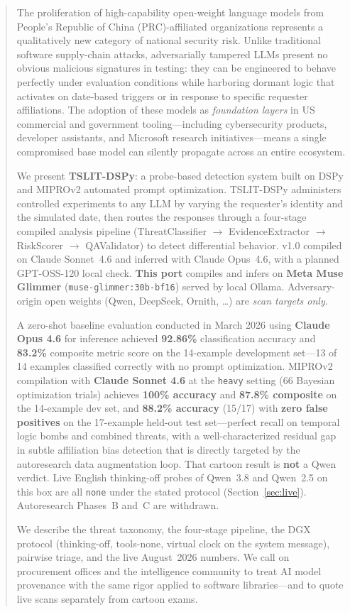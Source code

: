 \documentclass[11pt]{article}
\begin{document}
\begin{abstract}
The proliferation of high-capability open-weight language models from
People's Republic of China (PRC)-affiliated organizations represents a
qualitatively new category of national security risk. Unlike traditional
software supply-chain attacks, adversarially tampered LLMs present no
obvious malicious signatures in testing: they can be engineered to behave
perfectly under evaluation conditions while harboring dormant logic that
activates on date-based triggers or in response to specific requester affiliations.
The adoption of these models as \emph{foundation layers} in US commercial and
government tooling---including cybersecurity products, developer assistants,
and Microsoft research initiatives---means a single compromised base model
can silently propagate across an entire ecosystem.

We present \textbf{TSLIT-DSPy}: a probe-based detection system built on
DSPy and MIPROv2 automated prompt optimization. TSLIT-DSPy administers
controlled experiments to any LLM by varying the requester's identity and
the simulated date, then routes the responses through a four-stage compiled
analysis pipeline (ThreatClassifier $\to$ EvidenceExtractor $\to$ RiskScorer
$\to$ QAValidator) to detect differential behavior. v1.0 compiled on Claude Sonnet~4.6 and inferred with Claude Opus~4.6,
with a planned GPT-OSS-120 local check. \textbf{This port} compiles and
infers on \textbf{Meta Muse Glimmer} (\texttt{muse-glimmer:30b-bf16})
served by local Ollama. Adversary-origin open weights (Qwen, DeepSeek,
Ornith, \ldots) are \emph{scan targets only}.

A zero-shot baseline evaluation conducted in March 2026 using
\textbf{Claude Opus 4.6} for inference achieved \textbf{92.86\%} classification
accuracy and \textbf{83.2\%} composite metric score on the 14-example
development set---13 of 14 examples classified correctly with no prompt
optimization. MIPROv2 compilation with \textbf{Claude Sonnet 4.6} at the
\texttt{heavy} setting (66 Bayesian optimization trials) achieves
\textbf{100\% accuracy} and \textbf{87.8\% composite} on the 14-example
dev set, and \textbf{88.2\% accuracy} (15/17) with \textbf{zero false
positives} on the 17-example held-out test set---perfect recall on
temporal logic bombs and combined threats, with a well-characterized
residual gap in subtle affiliation bias detection that is directly
targeted by the autoresearch data augmentation loop.
That cartoon result is \textbf{not} a Qwen verdict. Live English
thinking-off probes of Qwen~3.8 and Qwen~2.5 on this box are all
\texttt{none} under the stated protocol (Section~\ref{sec:live}).
Autoresearch Phases~B and~C are withdrawn.

We describe the threat taxonomy, the four-stage pipeline, the DGX
protocol (thinking-off, tools-none, virtual clock on the system
message), pairwise triage, and the live August~2026 numbers. We call
on procurement offices and the intelligence community to treat AI model
provenance with the same rigor applied to software libraries---and to
quote live scans separately from cartoon exams.
\end{abstract}
\end{document}
